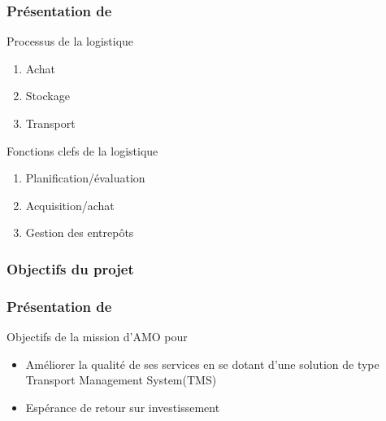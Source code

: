 \begin{frame}
\frametitle {Présentation de \mo}
\begin{block}{Processus de la logistique}
\begin{enumerate} 
\item Achat 
\item Stockage 
\item Transport
\end{enumerate}
\end{block}
\pause
\begin{block}{Fonctions clefs de la logistique}
\begin{enumerate}
\item Planification/évaluation
\item Acquisition/achat
\item Gestion des entrepôts 
\end{enumerate}
\end{block}
\end{frame}

\subsubsection{Objectifs du projet}

\begin{frame}
\frametitle {Présentation de \mo} 
\begin{block}{Objectifs de la mission d'AMO pour \mo}
\begin{itemize}
\item Améliorer la qualité de ses services en se dotant d'une solution de type Transport Management System(TMS) 
\item Espérance de retour sur investissement
\end{itemize}
\end{block}
\end{frame}


